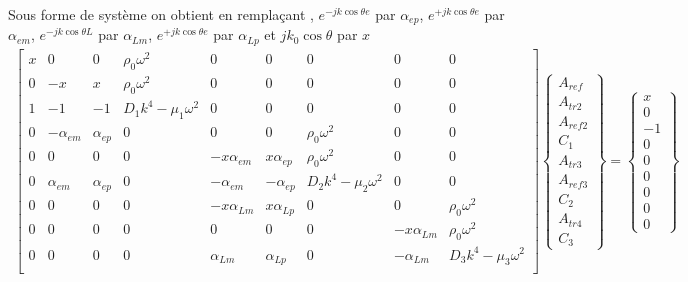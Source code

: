 \documentclass[12pt,foolscap]{report}
\begin{document}
	Sous forme de système on obtient en remplaçant , $e^{-jk\cos \theta e}$ par $\alpha_{ep}$, $e^{+jk\cos \theta e}$ par $\alpha_{em}$,  $e^{-jk\cos \theta L}$ par $\alpha_{Lm}$, $e^{+jk\cos \theta e}$ par $\alpha_{Lp}$ et $jk_0\cos\theta$ par $x$
	\begin{align}	
	\begin{bmatrix}
	x   &0 & 0 &\rho_0\omega^2&0&0&0&0&0  \\
	0       & -x & x  &\rho_0\omega^2 & 0&0&0&0&0   \\
	1       & -1 & -1  &D_1k^4-\mu_1 \omega^2 &  0&0&0&0&0  \\
	0    &-\alpha_{em}   & \alpha_{ep}&0   &0&0&\rho_0\omega^2&0&0 \\
	0       & 0 & 0 &0&-x\alpha_{em}   & x\alpha_{ep} & \rho_0\omega^2&0&0  \\
	0     &\alpha_{em}   & \alpha_{ep} &0 &-\alpha_{em}   & -\alpha_{ep}& D_2k^4-\mu_2 \omega^2&0&0  \\
	0&0&0&0&-x\alpha_{Lm}   & x\alpha_{Lp}&0&0&  \rho_0\omega^2\\
	0&0&0&0&0&0&0&-x\alpha_{Lm} &  \rho_0\omega^2\\
	0&0&0&0&\alpha_{Lm}&\alpha_{Lp}&0&-\alpha_{Lm} &  D_3k^4 -\mu_3 \omega^2\\
	\end{bmatrix}
	\begin{Bmatrix}
	A_{ref} \\
	A_{tr2} \\
	A_{ref2}\\
	C_{1} \\
	A_{tr3}\\
	A_{ref3}\\
	C_{2} \\
	A_{tr4}\\
	C_{3} 
	\end{Bmatrix}
	=\begin{Bmatrix}
	x\\
	0 \\
	-1\\
	0\\
	0 \\
	0\\
	0\\
	0\\
	0
	\end{Bmatrix}
	\end{align}
	
\end{document}
